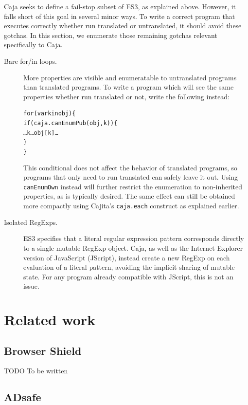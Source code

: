 \documentclass[letterpaper,twocolumn,10pt]{article}
\newcommand{\code}[1]{{\tt {#1}}}              %
\begin{document}
Caja seeks to define a fail-stop subset of ES3, as explained above. However, 
it falls short of this goal in several minor ways. To write a correct program 
that executes correctly whether run translated or untranslated, it should 
avoid these gotchas. In this section, we enumerate those remaining gotchas
relevant specifically to Caja.

\begin{description}

  \item[Bare for/in loops.] More properties are visible and enumeratable to 
  untranslated programs than translated programs. To write a program which 
  will see the same properties whether run translated or not, write the 
  following instead:
%
\begin{alltt}
for (var k in obj) \{ 
  if (caja.canEnumPub(obj,k)) \{
    {\ldots}k{\ldots}obj[k]\ldots
  \}
\}
\end{alltt}
%
  This conditional does not affect the behavior of translated programs, so
  programs that only need to run translated can safely leave it out. Using
  \code{canEnumOwn} instead will further restrict the enumeration to
  non-inherited properties, as is typically desired. The same effect can still
  be obtained more compactly using Cajita's \code{caja.each} construct as
  explained earlier.

  \item[Isolated RegExps.] ES3 specifies that a literal regular expression 
  pattern corresponds directly to a single mutable RegExp object. Caja, as 
  well as the Internet Explorer version of JavaScript (JScript), instead 
  create a new RegExp on each evaluation of a literal pattern, avoiding the 
  implicit sharing of mutable state. For any program already compatible with 
  JScript, this is not an issue.
    
\end{description}

\section{Related work}
\label{sec:related}

\subsection{Browser Shield}

TODO To be written

\subsection{ADsafe}
\end{document}
